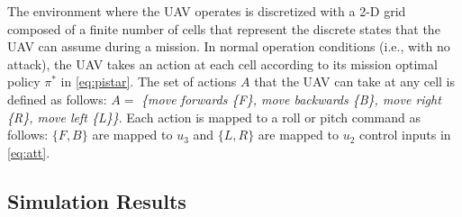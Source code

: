 \documentclass[letterpaper, 10 pt, conference]{ieeeconf}  %
\begin{document}
The environment where the UAV operates is discretized with a 2-D grid composed of a finite number of cells that represent the discrete states that the UAV can assume during a mission.
In normal operation conditions (i.e., with no attack), the UAV takes an action at each cell according to its mission optimal policy $\pi^*$ in \eqref{eq:pistar}. The set of actions $A$ that the UAV can take at any cell is defined as follows:
$A =$ \textit{\{move forwards \{F\}, move backwards \{B\}, move right \{R\}, move left \{L\}\}}.
Each action is mapped to a roll or pitch command as follows: $\{F, B\}$ are mapped to $u_3$ and $\{L, R\}$ are mapped to $u_2$ control inputs in \eqref{eq:att}. 
\subsection{Simulation Results}
\end{document}
